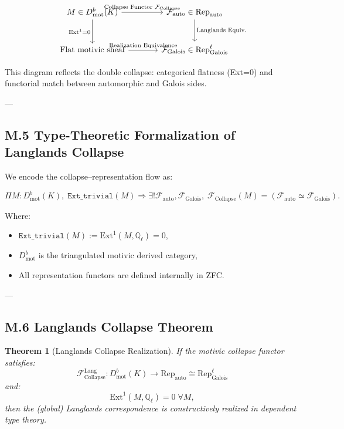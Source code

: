 \documentclass[11pt]{article}
\newtheorem{theorem}{Theorem}[section]
\begin{document}
\[
\begin{tikzcd}[column sep=large, row sep=large]
M \in D^b_{\mathrm{mot}}(K) \arrow[r, "\text{Collapse Functor } \mathcal{F}_{\mathrm{Collapse}}"] \arrow[d, swap, "\mathrm{Ext}^1 = 0"]
& \mathcal{F}_{\mathrm{auto}} \in \mathrm{Rep}_{\mathrm{auto}} \arrow[d, "\text{Langlands Equiv.}"] \\
\text{Flat motivic sheaf} \arrow[r, "\text{Realization Equivalence}"]
& \mathcal{F}_{\mathrm{Galois}} \in \mathrm{Rep}_\mathrm{Galois}^\ell
\end{tikzcd}
\]

This diagram reflects the double collapse: categorical flatness (Ext=0) and functorial match between automorphic and Galois sides.

---

\subsection*{M.5 Type-Theoretic Formalization of Langlands Collapse}

We encode the collapse–representation flow as:

\[
\Pi M : D^b_{\mathrm{mot}}(K),\;
\texttt{Ext\_trivial}(M) \Rightarrow
\exists! \mathcal{F}_{\mathrm{auto}}, \mathcal{F}_{\mathrm{Galois}},\;
\mathcal{F}_{\mathrm{Collapse}}(M) = (\mathcal{F}_{\mathrm{auto}} \simeq \mathcal{F}_{\mathrm{Galois}}).
\]

Where:
\begin{itemize}
  \item $\texttt{Ext\_trivial}(M) := \mathrm{Ext}^1(M, \mathbb{Q}_\ell) = 0$,
  \item $D^b_{\mathrm{mot}}$ is the triangulated motivic derived category,
  \item All representation functors are defined internally in ZFC.
\end{itemize}

---

\subsection*{M.6 Langlands Collapse Theorem}

\begin{theorem}[Langlands Collapse Realization]
If the motivic collapse functor satisfies:
\[
\mathcal{F}_{\mathrm{Collapse}}^{\mathrm{Lang}} : D^b_{\mathrm{mot}}(K) \to \mathrm{Rep}_{\mathrm{auto}} \cong \mathrm{Rep}_\mathrm{Galois}^\ell
\]
and:
\[
\mathrm{Ext}^1(M, \mathbb{Q}_\ell) = 0 \; \forall M,
\]
then the (global) Langlands correspondence is constructively realized in dependent type theory.
\end{theorem}
\end{document}
